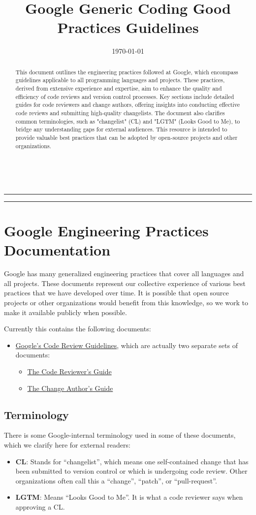 \documentclass[
]{article}
\title{Google Generic Coding Good Practices Guidelines}
\date{\today}
\makeatletter
\providecommand{\tightlist}{%
  \setlength{\itemsep}{0pt}\setlength{\parskip}{0pt}}
\renewcommand{\maketitle}{
    \begin{titlepage}
        \begin{center}
            \vspace*{\fill}
            {\Huge \textbf{\@title}}
            \par\vspace{1.5cm}
            {\large \@date} \\[4cm]
            \hrule
            \begin{abstract}
              \large
              This document outlines the engineering practices followed at Google, which encompass guidelines applicable to all programming languages and projects.
              These practices, derived from extensive experience and expertise, aim to enhance the quality and efficiency of code reviews and version control processes.
              Key sections include detailed guides for code reviewers and change authors, offering insights into conducting effective code reviews and submitting high-quality changelists.
              The document also clarifies common terminologies, such as "changelist" (CL) and "LGTM" (Looks Good to Me), to bridge any understanding gaps for external audiences.
              This resource is intended to provide valuable best practices that can be adopted by open-source projects and other organizations.
            \end{abstract}
            \hrule
            \vspace*{\fill}
          \end{center}
        \end{titlepage}
        }
\makeatother
\begin{document}
\maketitle

\clearpage
{
\setcounter{tocdepth}{3}
\tableofcontents
}

\clearpage
\section{Google Engineering Practices
Documentation}\label{google-engineering-practices-documentation}

Google has many generalized engineering practices that cover all
languages and all projects. These documents represent our collective
experience of various best practices that we have developed over time.
It is possible that open source projects or other organizations would
benefit from this knowledge, so we work to make it available publicly
when possible.

Currently this contains the following documents:

\begin{itemize}
\tightlist
\item
  \href{review/index.md}{Google's Code Review Guidelines}, which are
  actually two separate sets of documents:

  \begin{itemize}
  \tightlist
  \item
    \href{review/reviewer/index.md}{The Code Reviewer's Guide}
  \item
    \href{review/developer/index.md}{The Change Author's Guide}
  \end{itemize}
\end{itemize}

\subsection{Terminology}\label{terminology}

There is some Google-internal terminology used in some of these
documents, which we clarify here for external readers:

\begin{itemize}
\tightlist
\item
  \textbf{CL}: Stands for ``changelist'', which means one self-contained
  change that has been submitted to version control or which is
  undergoing code review. Other organizations often call this a
  ``change'', ``patch'', or ``pull-request''.
\item
  \textbf{LGTM}: Means ``Looks Good to Me''. It is what a code reviewer
  says when approving a CL.
\end{itemize}
\end{document}
